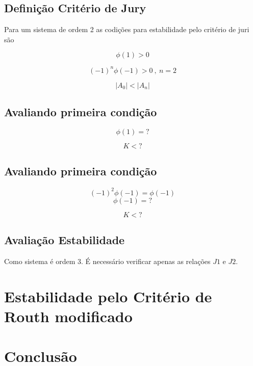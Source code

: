 \documentclass[a4paper,11pt]{article}
\begin{document}
\subsection{Definição Critério de Jury}

Para um sistema de ordem 2 as codições para estabilidade pelo critério de juri são

\begin{equation}\label{eq:jury-c1}
    \phi(1) > 0
\end{equation}

\begin{equation}\label{eq:jury-c2}
    (-1)^n\phi(-1) > 0\ ,\ n=2
\end{equation}

\begin{equation}\label{eq:jury-c3}
    |A_0| < |A_n|
\end{equation}

\subsection{Avaliando primeira condição}

$$\phi(1) = ? $$

\begin{equation}\label{eq:k-jury-c1}
    K < ?
\end{equation}

\subsection{Avaliando primeira condição}

$$(-1)^2\phi(-1) = \phi(-1)$$
$$\phi(-1) = ?$$

\begin{equation}\label{eq:k-jury-c1}
    K < ?
\end{equation}

\subsection{Avaliação Estabilidade}

Como sistema é ordem 3. É necessário verificar apenas as relações $J1$ e $J2$.

\section{Estabilidade pelo Critério de Routh modificado}


\section{Conclusão}






\end{document}
